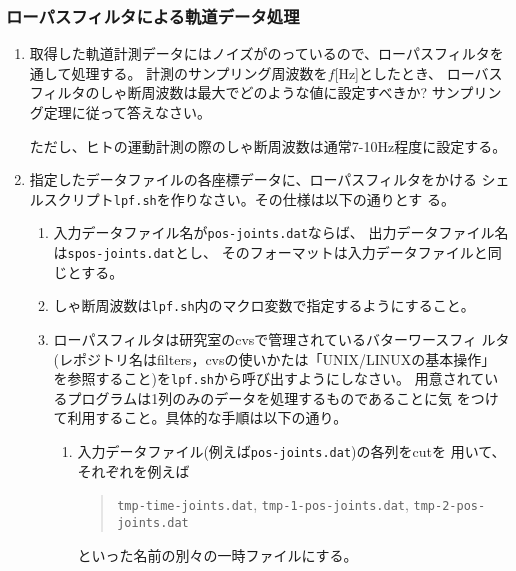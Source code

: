 \documentclass{jarticle}
\begin{document}
\subsubsection{ローパスフィルタによる軌道データ処理}
\begin{enumerate}
\item 取得した軌道計測データにはノイズがのっているので、ローパスフィルタを
  通して処理する。
  計測のサンプリング周波数を$f$[Hz]としたとき、
  ローバスフィルタのしゃ断周波数は最大でどのような値に設定すべきか? 
  サンプリング定理に従って答えなさい。

  ただし、ヒトの運動計測の際のしゃ断周波数は通常7-10Hz程度に設定する。
\item 指定したデータファイルの各座標データに、ローパスフィルタをかける
  シェルスクリプト\verb|lpf.sh|を作りなさい。その仕様は以下の通りとす
  る。
  \begin{enumerate}
  \item 入力データファイル名が\verb|pos-joints.dat|ならば、
    出力データファイル名は\verb|spos-joints.dat|とし、
    そのフォーマットは入力データファイルと同じとする。
  \item しゃ断周波数は\verb|lpf.sh|内のマクロ変数で指定するようにすること。
  \item ローパスフィルタは研究室のcvsで管理されているバターワースフィ
    ルタ(レポジトリ名はfilters，cvsの使いかたは「UNIX/LINUXの基本操作」
    を参照すること)を\verb|lpf.sh|から呼び出すようにしなさい。
    用意されているプログラムは1列のみのデータを処理するものであることに気
    をつけて利用すること。具体的な手順は以下の通り。
    \begin{enumerate}
    \item 入力データファイル(例えば\verb|pos-joints.dat|)の各列をcutを
      用いて、それぞれを例えば
      \begin{quote}
        \verb|tmp-time-joints.dat|, 
        \verb|tmp-1-pos-joints.dat|, 
        \verb|tmp-2-pos-joints.dat|
      \end{quote}
      といった名前の別々の一時ファイルにする。


\end{enumerate}
\end{enumerate}
\end{enumerate}
\end{document}
